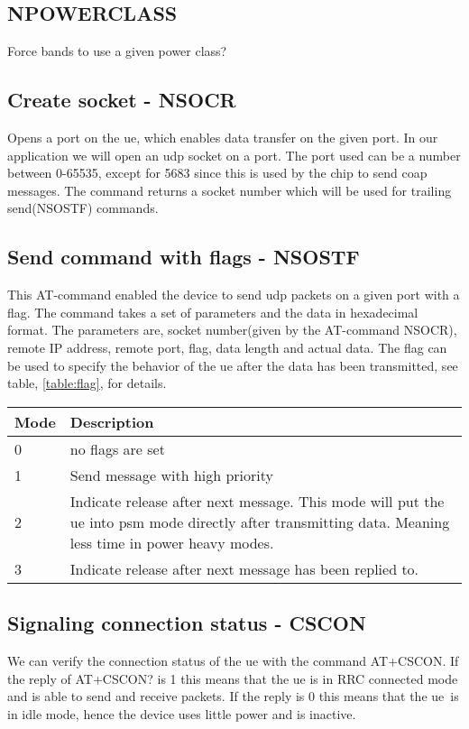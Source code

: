 \documentclass[USenglish]{ifimaster}  %
\begin{document}
\subsection{NPOWERCLASS}
Force bands to use a given power class?

\subsection{Create socket - NSOCR}
Opens a port on the \acrshort{ue}, which enables data transfer on the given port. In our application we will open an \acrshort{udp} socket on a port. The port used can be a number between 0-65535, except for 5683 since this is used by the chip to send coap messages. The command returns a socket number which will be used for trailing send(NSOSTF) commands.

\subsection{Send command with flags - NSOSTF}
This AT-command enabled the device to send \acrshort{udp} packets on a given port with a flag. The command takes a set of parameters and the data in hexadecimal format. The parameters are, socket number(given by the AT-command NSOCR), remote IP address, remote port, flag, data length and actual data. The flag can be used to specify the behavior of the \acrshort{ue} after the data has been transmitted, see table, \vref{table:flag}, for details.

\begin{center} \label{table:flag}
  \begin{tabular}{ | l | m{10cm} | }
    \hline
    Mode & Description \\
    \hline
    0 & no flags are set \\
    \hline
    1 & Send message with high priority \\
    \hline
    2 & Indicate release after next message. This mode will put the \acrshort{ue} into \acrshort{psm} mode directly after transmitting data. Meaning less time in power heavy modes. \\
    \hline
    3 & Indicate release after next message has been replied to. \\
    \hline
  \end{tabular}
\end{center}

\subsection{Signaling connection status - CSCON}
We can verify the connection status of the \acrshort{ue} with the command AT+CSCON. If the reply of AT+CSCON? is 1 this means that the \acrshort{ue} is in RRC connected mode and is able to send and receive packets. If the reply is 0 this means that the \acrshort{ue} is in idle mode, hence the device uses little power and is inactive.
\end{document}

